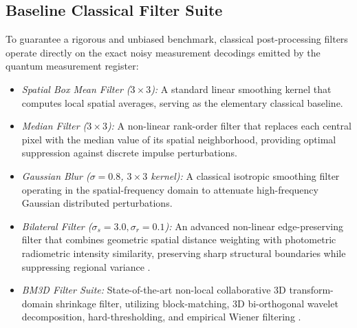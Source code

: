 \documentclass[12pt,onecolumn,draftclsnofoot]{IEEEtran}
\begin{document}
\subsection{Baseline Classical Filter Suite}
To guarantee a rigorous and unbiased benchmark, classical post-processing filters operate directly on the exact noisy measurement decodings emitted by the quantum measurement register:
\begin{itemize}
    \item \textit{Spatial Box Mean Filter ($3 \times 3$):} A standard linear smoothing kernel that computes local spatial averages, serving as the elementary classical baseline.
    \item \textit{Median Filter ($3 \times 3$):} A non-linear rank-order filter that replaces each central pixel with the median value of its spatial neighborhood, providing optimal suppression against discrete impulse perturbations.
    \item \textit{Gaussian Blur ($\sigma = 0.8$, $3 \times 3$ kernel):} A classical isotropic smoothing filter operating in the spatial-frequency domain to attenuate high-frequency Gaussian distributed perturbations.
    \item \textit{Bilateral Filter ($\sigma_s = 3.0, \sigma_r = 0.1$):} An advanced non-linear edge-preserving filter that combines geometric spatial distance weighting with photometric radiometric intensity similarity, preserving sharp structural boundaries while suppressing regional variance \cite{tomasi1998bilateral}.
    \item \textit{BM3D Filter Suite:} State-of-the-art non-local collaborative 3D transform-domain shrinkage filter, utilizing block-matching, 3D bi-orthogonal wavelet decomposition, hard-thresholding, and empirical Wiener filtering \cite{dabov2007image}.
\end{itemize}
\end{document}

